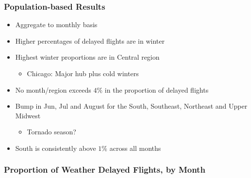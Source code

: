 \documentclass{beamer}
\begin{document}
\begin{frame}
\frametitle{Population-based Results}
\begin{itemize}
\item Aggregate to monthly basis

\item Higher percentages of delayed flights are in winter

\item Highest winter proportions are in Central region
\begin{itemize}
\item Chicago: Major hub plus cold winters
\end{itemize}

\item No month/region exceeds $4\%$ in the proportion of delayed flights

\item Bump in Jun, Jul and August for the South, Southeast, Northeast and Upper Midwest
\begin{itemize}
\item Tornado season?
\end{itemize}

\item South is consistently above $1\%$ across all months

\end{itemize}
\end{frame}




\begin{frame}
\frametitle{Proportion of Weather Delayed Flights, by Month}
\begin{center}
\end{center}
\end{frame}
\end{document}
